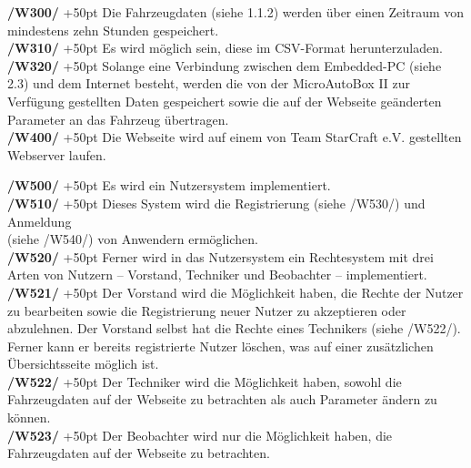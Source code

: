 \documentclass[fontsize = 12pt, paper = a4]{scrreprt}
\begin{document}
\textbf{/W300/}
\hangindent+50pt 
Die Fahrzeugdaten (siehe 1.1.2) werden über einen Zeitraum von mindestens zehn Stunden gespeichert. \\

\textbf{/W310/} 
\hangindent+50pt 
Es wird möglich sein, diese im \gls{CSV}-Format herunterzuladen. \\

\textbf{/W320/} 
\hangindent+50pt 
Solange eine Verbindung zwischen dem \gls{Embedded-PC} (siehe 2.3) und  dem Internet besteht, werden die von der \gls{MicroAutoBox II} zur Verfügung gestellten Daten gespeichert sowie die auf der Webseite geänderten Parameter an das Fahrzeug übertragen. \\

\textbf{/W400/} 
\hangindent+50pt 
Die Webseite wird auf einem von Team StarCraft e.V. gestellten Webserver laufen. \\

\newpage



\textbf{/W500/} 
\hangindent+50pt 
Es wird ein \gls{Nutzersystem}  implementiert. \\

\textbf{/W510/} 
\hangindent+50pt 
Dieses System wird die Registrierung (siehe /W530/) und Anmeldung \\ (siehe /W540/) von Anwendern ermöglichen. \\ 

\textbf{/W520/} 
\hangindent+50pt 
Ferner wird in das \gls{Nutzersystem} ein \gls{Rechtesystem} mit drei Arten von Nutzern \--- Vorstand, Techniker und Beobachter \--- implementiert. \\

\textbf{/W521/} 
\hangindent+50pt 
Der Vorstand wird die Möglichkeit haben, die \gls{Recht}e der Nutzer zu  bearbeiten sowie die Registrierung neuer Nutzer zu akzeptieren oder abzulehnen. Der Vorstand selbst hat die \gls{Recht}e eines Technikers (siehe /W522/). Ferner kann er bereits registrierte Nutzer löschen, was auf einer zusätzlichen Übersichtsseite möglich ist. \\

\textbf{/W522/} 
\hangindent+50pt 
Der Techniker wird die Möglichkeit haben, sowohl die Fahrzeugdaten auf der Webseite zu betrachten als auch Parameter ändern zu können. \\

\textbf{/W523/} 
\hangindent+50pt 
Der Beobachter wird nur die Möglichkeit haben, die Fahrzeugdaten auf der Webseite zu betrachten. \\
\end{document}
